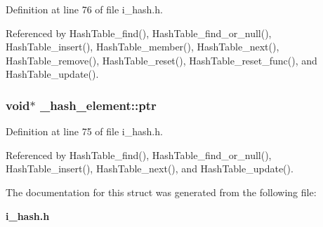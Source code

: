 Definition at line 76 of file i\_\-hash.h.

Referenced by Hash\-Table\_\-find(), Hash\-Table\_\-find\_\-or\_\-null(), Hash\-Table\_\-insert(), Hash\-Table\_\-member(), Hash\-Table\_\-next(), Hash\-Table\_\-remove(), Hash\-Table\_\-reset(), Hash\-Table\_\-reset\_\-func(), and Hash\-Table\_\-update().
\subsubsection{\setlength{\rightskip}{0pt plus 5cm}void$\ast$ \bf{\_\-hash\_\-element::ptr}}\label{struct__hash__element_08a0130081a46d57f77856e9eccfa090}




Definition at line 75 of file i\_\-hash.h.

Referenced by Hash\-Table\_\-find(), Hash\-Table\_\-find\_\-or\_\-null(), Hash\-Table\_\-insert(), Hash\-Table\_\-next(), and Hash\-Table\_\-update().

The documentation for this struct was generated from the following file:\begin{CompactItemize}
\item 
\bf{i\_\-hash.h}\end{CompactItemize}
